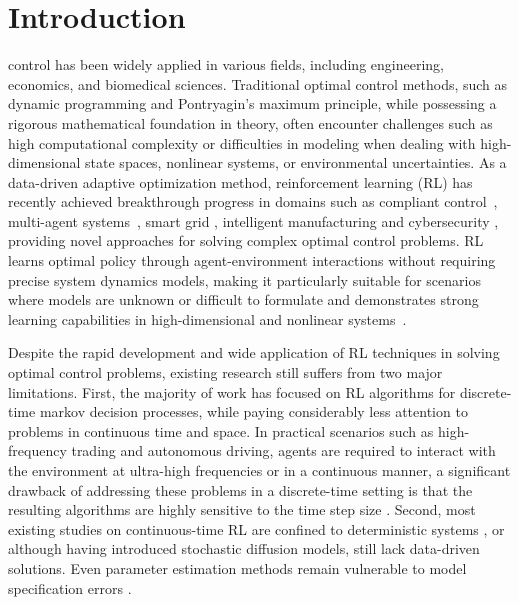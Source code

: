 \documentclass[onecolumn, journal]{IEEEtran} %
\begin{document}
	\section{Introduction}
	 control has been widely applied in various fields, including engineering, economics, and biomedical sciences. Traditional optimal control methods, such as dynamic programming and Pontryagin's maximum principle, while possessing a rigorous mathematical foundation in theory, often encounter challenges such as high computational complexity or difficulties in modeling when dealing with high-dimensional state spaces, nonlinear systems, or environmental uncertainties. As a data-driven adaptive optimization method, reinforcement learning (RL) has recently achieved breakthrough progress in domains such as compliant control~\cite{Li2024}, multi-agent systems~\cite{Liu2024, Dai2025}, smart grid \cite{Dai2020a}, intelligent manufacturing \cite {qin2024value} and cybersecurity \cite{Dai2020b}, providing novel approaches for solving complex optimal control problems. RL learns optimal policy through agent-environment interactions without requiring precise system dynamics models, making it particularly suitable for scenarios where models are unknown or difficult to formulate and demonstrates strong learning capabilities in high-dimensional and nonlinear systems~\cite{jiao2024novel}.
	
	Despite the rapid development and wide application of RL techniques in solving optimal control problems, existing research still suffers from two major limitations. First, the majority of work has focused on RL algorithms for discrete-time markov decision processes, while paying considerably less attention to problems in continuous time and space. In practical scenarios such as high-frequency trading and autonomous driving, agents are required to interact with the environment at ultra-high frequencies or in a continuous manner, a significant drawback of addressing these problems in a discrete-time setting is that the resulting algorithms are highly sensitive to the time step size 
	\cite{yildiz2021continuous}. Second, most existing studies on continuous-time RL are confined to deterministic systems \cite{lee2021policy}, or although having introduced stochastic diffusion models, still lack data-driven solutions. Even parameter estimation methods remain vulnerable to model specification errors \cite{basei2022logarithmic}.
	
\end{document}
